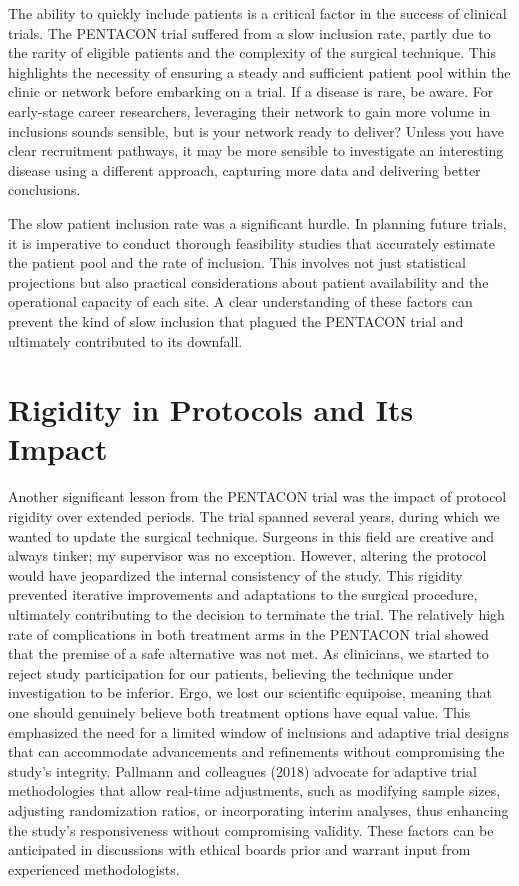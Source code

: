 \documentclass[authordate, empirical]{jote-new-article}
\begin{document}
	The ability to quickly include patients is a critical factor in the success of clinical trials. The PENTACON trial suffered from a slow inclusion rate, partly due to the rarity of eligible patients and the complexity of the surgical technique. This highlights the necessity of ensuring a steady and sufficient patient pool within the clinic or network before embarking on a trial. If a disease is rare, be aware. For early-stage career researchers, leveraging their network to gain more volume in inclusions sounds sensible, but is your network ready to deliver? Unless you have clear recruitment pathways, it may be more sensible to investigate an interesting disease using a different approach, capturing more data and delivering better conclusions.



	The slow patient inclusion rate was a significant hurdle. In planning future trials, it is imperative to conduct thorough feasibility studies that accurately estimate the patient pool and the rate of inclusion. This involves not just statistical projections but also practical considerations about patient availability and the operational capacity of each site. A clear understanding of these factors can prevent the kind of slow inclusion that plagued the PENTACON trial and ultimately contributed to its downfall.



	\section{Rigidity in Protocols and Its Impact}



	Another significant lesson from the PENTACON trial was the impact of protocol rigidity over extended periods. The trial spanned several years, during which we wanted to update the surgical technique. Surgeons in this field are creative and always tinker; my supervisor was no exception. However, altering the protocol would have jeopardized the internal consistency of the study. This rigidity prevented iterative improvements and adaptations to the surgical procedure, ultimately contributing to the decision to terminate the trial. The relatively high rate of complications in both treatment arms in the PENTACON trial showed that the premise of a safe alternative was not met. As clinicians, we started to reject study participation for our patients, believing the technique under investigation to be inferior. Ergo, we lost our scientific equipoise, meaning that one should genuinely believe both treatment options have equal value. This emphasized the need for a limited window of inclusions and adaptive trial designs that can accommodate advancements and refinements without compromising the study's integrity. Pallmann and colleagues (2018) advocate for adaptive trial methodologies that allow real-time adjustments, such as modifying sample sizes, adjusting randomization ratios, or incorporating interim analyses, thus enhancing the study's responsiveness without compromising validity. These factors can be anticipated in discussions with ethical boards prior and warrant input from experienced methodologists.
\end{document}

